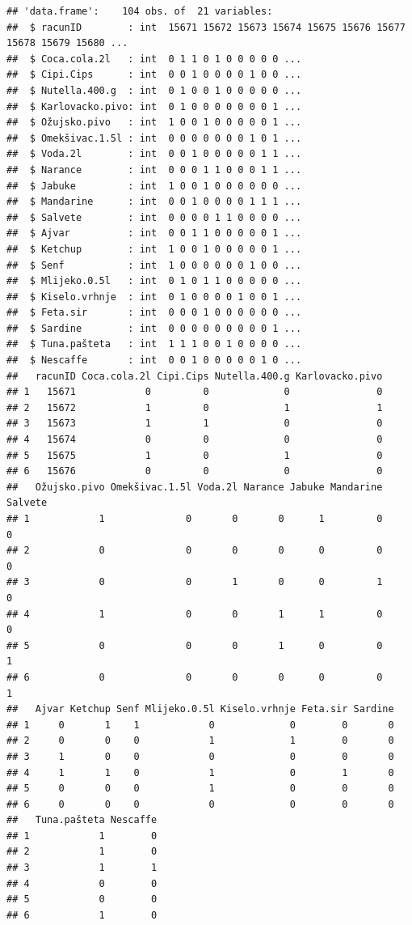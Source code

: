 \documentclass[]{book}
\theoremstyle{definition}
\theoremstyle{definition}
\theoremstyle{definition}
\theoremstyle{remark}
\begin{document}
\begin{verbatim}
## 'data.frame':    104 obs. of  21 variables:
##  $ racunID        : int  15671 15672 15673 15674 15675 15676 15677 15678 15679 15680 ...
##  $ Coca.cola.2l   : int  0 1 1 0 1 0 0 0 0 0 ...
##  $ Cipi.Cips      : int  0 0 1 0 0 0 0 1 0 0 ...
##  $ Nutella.400.g  : int  0 1 0 0 1 0 0 0 0 0 ...
##  $ Karlovacko.pivo: int  0 1 0 0 0 0 0 0 0 1 ...
##  $ Ožujsko.pivo   : int  1 0 0 1 0 0 0 0 0 1 ...
##  $ Omekšivac.1.5l : int  0 0 0 0 0 0 0 1 0 1 ...
##  $ Voda.2l        : int  0 0 1 0 0 0 0 0 1 1 ...
##  $ Narance        : int  0 0 0 1 1 0 0 0 1 1 ...
##  $ Jabuke         : int  1 0 0 1 0 0 0 0 0 0 ...
##  $ Mandarine      : int  0 0 1 0 0 0 0 1 1 1 ...
##  $ Salvete        : int  0 0 0 0 1 1 0 0 0 0 ...
##  $ Ajvar          : int  0 0 1 1 0 0 0 0 0 1 ...
##  $ Ketchup        : int  1 0 0 1 0 0 0 0 0 1 ...
##  $ Senf           : int  1 0 0 0 0 0 0 1 0 0 ...
##  $ Mlijeko.0.5l   : int  0 1 0 1 1 0 0 0 0 0 ...
##  $ Kiselo.vrhnje  : int  0 1 0 0 0 0 1 0 0 1 ...
##  $ Feta.sir       : int  0 0 0 1 0 0 0 0 0 0 ...
##  $ Sardine        : int  0 0 0 0 0 0 0 0 0 1 ...
##  $ Tuna.pašteta   : int  1 1 1 0 0 1 0 0 0 0 ...
##  $ Nescaffe       : int  0 0 1 0 0 0 0 0 1 0 ...
##   racunID Coca.cola.2l Cipi.Cips Nutella.400.g Karlovacko.pivo
## 1   15671            0         0             0               0
## 2   15672            1         0             1               1
## 3   15673            1         1             0               0
## 4   15674            0         0             0               0
## 5   15675            1         0             1               0
## 6   15676            0         0             0               0
##   Ožujsko.pivo Omekšivac.1.5l Voda.2l Narance Jabuke Mandarine Salvete
## 1            1              0       0       0      1         0       0
## 2            0              0       0       0      0         0       0
## 3            0              0       1       0      0         1       0
## 4            1              0       0       1      1         0       0
## 5            0              0       0       1      0         0       1
## 6            0              0       0       0      0         0       1
##   Ajvar Ketchup Senf Mlijeko.0.5l Kiselo.vrhnje Feta.sir Sardine
## 1     0       1    1            0             0        0       0
## 2     0       0    0            1             1        0       0
## 3     1       0    0            0             0        0       0
## 4     1       1    0            1             0        1       0
## 5     0       0    0            1             0        0       0
## 6     0       0    0            0             0        0       0
##   Tuna.pašteta Nescaffe
## 1            1        0
## 2            1        0
## 3            1        1
## 4            0        0
## 5            0        0
## 6            1        0
\end{verbatim}
\end{document}

